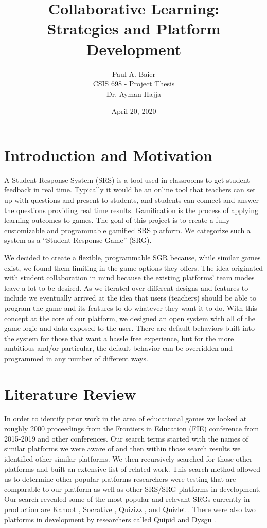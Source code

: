 \documentclass{article}
\title{Collaborative Learning: \\
    \normalsize Strategies and Platform Development
}
\author{Paul A. Baier \\ 
    \footnotesize CSIS 698 - Project Thesis \\
    \footnotesize Dr. Ayman Hajja
}
\date{April 20, 2020}
\begin{document}
\maketitle

\section{Introduction and Motivation}
    A Student Response System (SRS) is a tool used in classrooms to get student feedback in real time. Typically it would be an online tool that teachers can set up with questions and present to students, and students can connect and answer the questions providing real time results. Gamification is the process of applying learning outcomes to games. The goal of this project is to create a fully customizable and programmable gamified SRS platform. We categorize such a system as a ``Student Response Game'' (SRG).
    \smallskip

    We decided to create a flexible, programmable SGR because, while similar games exist, we found them limiting in the game options they offers. The idea originated with student collaboration in mind because the existing platforms' team modes leave a lot to be desired. As we iterated over different designs and features to include we eventually arrived at the idea that users (teachers) should be able to program the game and its features to do whatever they want it to do. With this concept at the core of our platform, we designed an open system with all of the game logic and data exposed to the user. There are default behaviors built into the system for those that want a hassle free experience, but for the more ambitious and/or particular, the default behavior can be overridden and programmed in any number of different ways.  

\section{Literature Review}
    In order to identify prior work in the area of educational games we looked at roughly 2000 proceedings from the Frontiers in Education (FIE) conference from 2015-2019 and other conferences. Our search terms started with the names of similar platforms we were aware of and then within those search results we identified other similar platforms. We then recursively searched for those other platforms and built an extensive list of related work. This search method allowed us to determine other popular platforms researchers were testing that are comparable to our platform as well as other SRS/SRG platforms in development. Our search revealed some of the most popular and relevant SRGs currently in production are Kahoot \cite{kahoot}, Socrative \cite{socrative}, Quizizz \cite{quizizz}, and Quizlet \cite{quizlet}. There were also two platforms in development by researchers called Quipid \cite{quipid} and Dysgu \cite{dysgu}.
\end{document}
